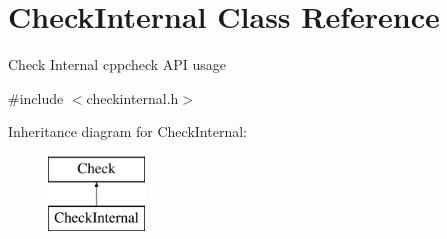 \hypertarget{class_check_internal}{\section{Check\-Internal Class Reference}
\label{class_check_internal}
}


Check Internal cppcheck A\-P\-I usage  




{\ttfamily \#include $<$checkinternal.\-h$>$}

Inheritance diagram for Check\-Internal\-:\begin{figure}[H]
\begin{center}
\leavevmode
\includegraphics[height=2.000000cm]{class_check_internal}
\end{center}
\end{figure}

